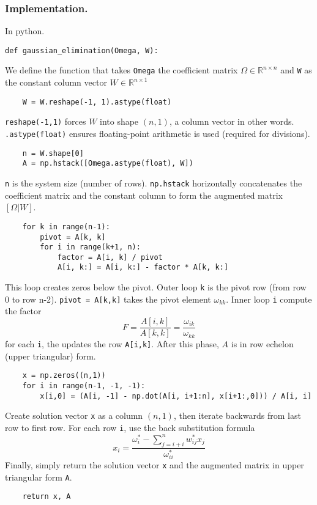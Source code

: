 \documentclass[../../../main.tex]{subfiles}
\begin{document}
\subsubsection{Implementation.}
In python.
\begin{verbatim}
def gaussian_elimination(Omega, W):
\end{verbatim}
We define the function that takes \verb|Omega| the coefficient matrix $\Omega \in \mathbb{R}^{n \times n}$ and \verb|W| as the constant column vector $W \in \mathbb{R}^{n \times 1}$
\begin{verbatim}
    W = W.reshape(-1, 1).astype(float)
\end{verbatim}
\verb|reshape(-1,1)| forces $W$ into shape $(n,1)$,  a column vector in other words.
\verb|.astype(float)| ensures floating-point arithmetic is used (required for divisions).
\begin{verbatim}
    n = W.shape[0]
    A = np.hstack([Omega.astype(float), W]) 
\end{verbatim}
\verb|n| is the system size (number of rows).
\verb|np.hstack| horizontally concatenates the coefficient matrix and the constant column to form the augmented matrix $[\Omega|W]$.
\begin{verbatim}
    for k in range(n-1):
        pivot = A[k, k]
        for i in range(k+1, n):
            factor = A[i, k] / pivot
            A[i, k:] = A[i, k:] - factor * A[k, k:] 
\end{verbatim}
This loop creates zeros below the pivot.
Outer loop \verb|k| is the pivot row (from row 0 to row n-2).
\verb|pivot = A[k,k]| takes the pivot element $\omega_{kk}$.
Inner loop \verb|i| compute the factor
\begin{equation*}
    F=\frac{A[i,k]}{A[k,k]}=\frac{\omega_{ik }}{\omega_{kk}}
\end{equation*}
for each \verb|i|, the updates the row \verb|A[i,k]|.
After this phase, $A$ is in row echelon (upper triangular) form.
\begin{verbatim}
    x = np.zeros((n,1))
    for i in range(n-1, -1, -1):
        x[i,0] = (A[i, -1] - np.dot(A[i, i+1:n], x[i+1:,0])) / A[i, i]
\end{verbatim}
Create solution vector \verb|x| as a column $(n,1)$, then iterate backwards from last row to first row.
For each row \verb|i|, use the back substitution formula
\begin{equation*}
    x_i =\frac{\omega_i ^* -\sum_{j=i+i }^{n }w_{ij}^*x_j}{\omega_{ii }^*}
\end{equation*}
Finally, simply return the solution vector \verb|x| and the augmented matrix in upper triangular form \verb|A|.
\begin{verbatim}
    return x, A    
\end{verbatim}
\end{document}
